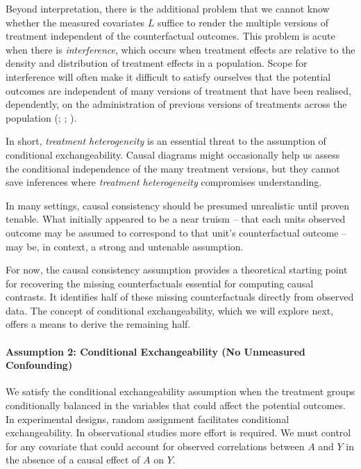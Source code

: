 \documentclass[
  singlecolumn,
  9pt]{article}
\let\oldparagraph\paragraph
\renewcommand{\paragraph}[1]{\oldparagraph{#1}\mbox{}}
\begin{document}
Beyond interpretation, there is the additional problem that we cannot
know whether the measured covariates \(L\) suffice to render the
multiple versions of treatment independent of the counterfactual
outcomes. This problem is acute when there is \emph{interference}, which
occurs when treatment effects are relative to the density and
distribution of treatment effects in a population. Scope for
interference will often make it difficult to satisfy ourselves that the
potential outcomes are independent of many versions of treatment that
have been realised, dependently, on the administration of previous
versions of treatments across the population
(;
;
).

In short, \emph{treatment heterogeneity} is an essential threat to the
assumption of conditional exchangeability. Causal diagrams might
occasionally help us assess the conditional independence of the many
treatment versions, but they cannot save inferences where
\emph{treatment heterogeneity} compromises understanding.

In many settings, causal consistency should be presumed unrealistic
until proven tenable. What initially appeared to be a near truism --
that each units observed outcome may be assumed to correspond to that
unit's counterfactual outcome -- may be, in context, a strong and
untenable assumption.

For now, the causal consistency assumption provides a theoretical
starting point for recovering the missing counterfactuals essential for
computing causal contrasts. It identifies half of these missing
counterfactuals directly from observed data. The concept of conditional
exchangeability, which we will explore next, offers a means to derive
the remaining half.

\paragraph{Assumption 2: Conditional Exchangeability (No Unmeasured
Confounding)}\label{assumption-2-conditional-exchangeability-no-unmeasured-confounding}

We satisfy the conditional exchangeability assumption when the treatment
groups conditionally balanced in the variables that could affect the
potential outcomes. In experimental designs, random assignment
facilitates conditional exchangeability. In observational studies more
effort is required. We must control for any covariate that could account
for observed correlations between \(A\) and \(Y\) in the absence of a
causal effect of \(A\) on \(Y\).
\end{document}
